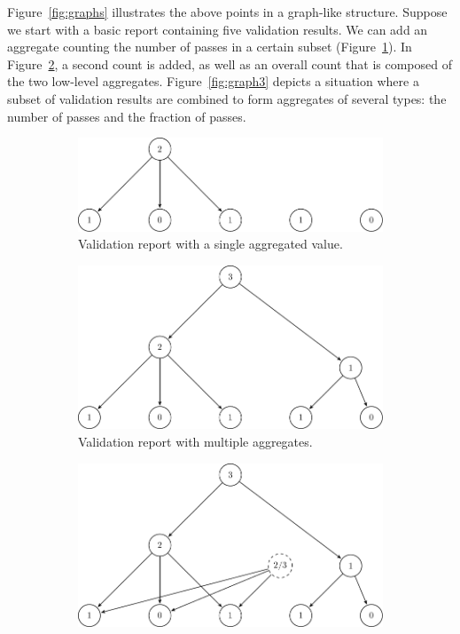 Figure~\ref{fig:graphs} illustrates the above points in a graph-like structure.
Suppose we start with a basic report containing five validation results. We can
add an aggregate counting the number of passes in a certain subset
(Figure~\ref{fig:graph1}).  In Figure~\ref{fig:graph2}, a second count is
added, as well as an overall count that is composed of the two low-level
aggregates. Figure~\ref{fig:graph3} depicts a situation where a subset of
validation results are combined to form aggregates of several types: the number
of passes and the fraction of passes.
%
\begin{figure}[!t]
  \centering
  \begin{subfigure}[b]{0.7\textwidth}
    \includegraphics[width=\textwidth]{fig/graph1.pdf}
    \caption{Validation report with a single aggregated value.}
    \label{fig:graph1}
  \end{subfigure}
  \begin{subfigure}[b]{0.7\textwidth}
    \includegraphics[width=\textwidth]{fig/graph2.pdf}
    \caption{Validation report with multiple aggregates.}
    \label{fig:graph2}
  \end{subfigure}
  \begin{subfigure}[b]{0.7\textwidth}
    \includegraphics[width=\textwidth]{fig/graph3.pdf}

\end{subfigure}
\end{figure}
